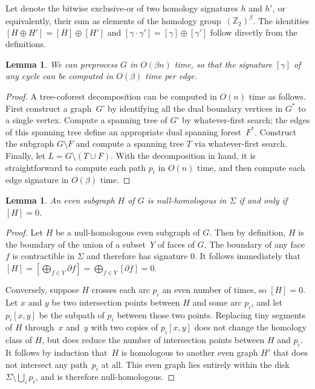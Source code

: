 \documentclass[11pt,twoside]{article}
\def\Z{\mathbb{Z}}
\let\cycle\gamma
\def\dualarc{p}
\newtheorem{lemma}[theorem]{Lemma}
\begin{document}
Let  denote the bitwise exclusive-or of two homology signatures $h$ and $h'$, or equivalently, their sum as elements of the homology group~$(\Z_2)^\beta$.  The identities $[H \oplus H'] = [H] \oplus [H']$ and $[\cycle\cdot\cycle'] = [\cycle] \oplus [\cycle']$ follow directly from the definitions.

\begin{lemma}
\label{lem:sign}
We can preprocess $G$ in $O(\beta n)$ time, so that the signature $[\cycle]$ of any cycle can be computed in $O(\beta)$ time per edge.
\end{lemma}

\begin{proof}
A tree-coforest decomposition can be computed in $O(n)$ time as follows.  First construct a graph~$G’$ by identifying all the dual boundary vertices in $G^*$ to a single vertex.  Compute a spanning tree of $G’$ by whatever-first search; the edges of this spanning tree define an appropriate dual spanning forest~$F^*$.  Construct the subgraph $G\setminus F$ and compute a spanning tree $T$ via whatever-first search.  Finally, let $L = G\setminus (T\cup F)$.  With the decomposition in hand, it is straightforward to compute each path $\dualarc_i$ in $O(n)$ time, and then compute each edge signature in $O(\beta)$ time.
\end{proof}

\begin{lemma}
An even subgraph $H$ of $G$ is null-homologous in $\Sigma$ if and only if $[H] = 0$.
\end{lemma}

\begin{proof}
Let $H$ be a null-homologous even subgraph of $G$.  Then by definition, $H$ is the boundary of the union of a subset~$Y$ of faces of $G$.  The boundary of any face $f$ is contractible in $\Sigma$ and therefore has signature $0$.  It follows immediately that $[H] = [\bigoplus_{f\in Y} \partial f] = \bigoplus_{f\in Y} [\partial f] = 0$.

Conversely, suppose $H$ crosses each arc $\dualarc_i$ an even number of times, so $[H]=0$.  Let $x$ and $y$ be two intersection points between $H$ and some arc $\dualarc_i$, and let $\dualarc_i[x,y]$ be the subpath of $\dualarc_i$ between those two points.  Replacing tiny segments of $H$ through~$x$ and~$y$ with two copies of $\dualarc_i[x,y]$ does not change the homology class of $H$, but does reduce the number of intersection points between $H$ and $\dualarc_i$.  It follows by induction that~$H$ is homologous to another even graph $H'$ that does not intersect any path~$\dualarc_i$ at all.  This even graph lies entirely within the disk $\Sigma\setminus \bigcup_i\dualarc_i$, and is therefore null-homologous.
\end{proof}
\end{document}
